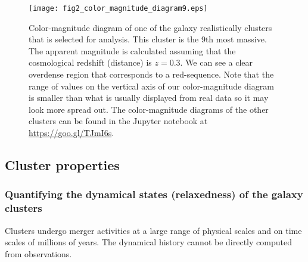 \begin{figure}
	\centering
	\texttt{[image: fig2\_color\_magnitude\_diagram9.eps]}
	\caption{Color-magnitude diagram of one of the galaxy realistically clusters that is selected for 
		analysis. This cluster is the 9th most massive. 
		The apparent magnitude is calculated assuming that 
		the cosmological redshift (distance) is $z = 0.3$. 
		We can see a clear overdense region that corresponds to a red-sequence.
		Note that the range of values on the vertical axis of our color-magnitude diagram is  
		smaller than what is usually displayed from real data so it may look more
		spread out.	The color-magnitude diagrams of the other clusters can be found in the
		Jupyter notebook at \href{https://github.com/karenyyng/galaxy_DM_offset/blob/master/code/analyses/fig2_color_magnitude_diagram.ipynb}{https://goo.gl/TJmI6s}.
		\label{fig:color_magnitude_diagram}
	} 
\end{figure}


\subsection{Cluster properties}
\label{subsec:cluster_properties}

\subsubsection{Quantifying the dynamical states (relaxedness) of the galaxy clusters}
\label{subsubsec:relaxedness}

Clusters undergo merger activities at a large range of physical scales and 
on time scales of millions of years. 
The dynamical history cannot be directly 
computed from observations. 

